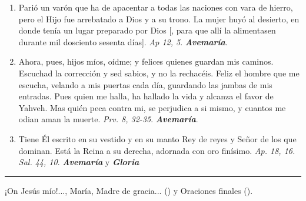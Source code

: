 \documentclass[./rosary.tex]{subfiles}
\begin{document}
\begin{enumerate}
      \item Parió un varón que ha de apacentar a todas las naciones con vara de hierro, pero el Hijo fue arrebatado a Dios y a su trono. La mujer huyó
            al desierto, en donde tenía un lugar preparado por Dios [, para que allí la alimentasen durante mil dosciento sesenta días]. \emph{Ap 12, 5}. \textbf{\emph{Avemaría}}.

      \item Ahora, pues, hijos míos, oídme; y felices quienes guardan mis caminos. Escuchad la corrección y sed sabios, y no la rechacéis.
            Feliz el hombre que me escucha, velando a mis puertas cada día, guardando las jambas de mis entradas. Pues quien me halla, ha hallado la vida y alcanza el favor
            de Yahveh. Mas quién peca contra mi, se perjudica a si mismo, y cuantos me odian aman la muerte. \emph{Prv. 8, 32-35}. \textbf{\emph{Avemaría}}.

      \item Tiene Él escrito en su vestido y en su manto Rey de reyes y Señor de los que dominan. Está la Reina a su derecha, adornada con oro finísimo.
            \emph{Ap. 18, 16. Sal. 44, 10}. \textbf{\emph{Avemaría}} y \textbf{\emph{Gloria}}
\end{enumerate}

\rule{\textwidth}{0.5pt}
¡On Jesús mío!..., María, Madre de gracia... () y Oraciones finales ().
\end{document}
